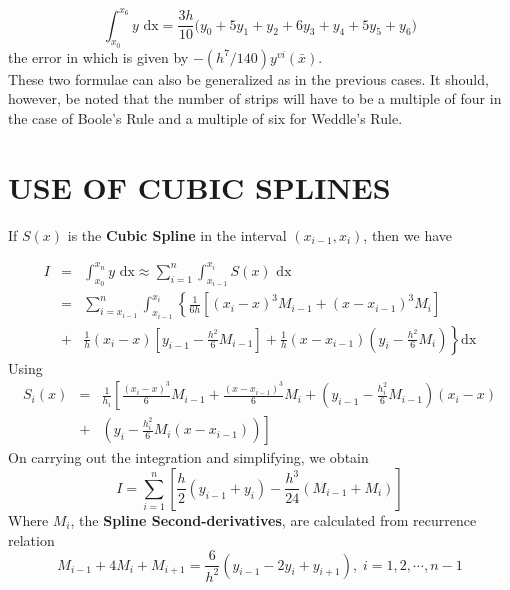 \documentclass[12pt]{report}
\newcommand{\sps}{\\[0.2cm]}
\newcommand{\bt}[1]{\textbf{#1}}
\begin{document}
	\begin{equation}
		\int_{x_0}^{x_6}y\text{ dx} = \frac{3h}{10}\big(y_0 + 5y_1 + y_2 + 6y_3 + y_4 + 5y_5 + y_6\big)
		\label{eq3_14} 
	\end{equation}
	the error in which is given by $-(h^7/140)y^{vi}(\bar{x})$.\sps
	These two formulae can also be generalized as in the previous cases. It should, however, be noted that the number of strips will have to be a multiple of four in the case of Boole's Rule and a multiple of six for Weddle's Rule.
	
	\section{USE OF CUBIC SPLINES}
	If $S(x)$ is the \bt{Cubic Spline} in the interval $(x_{i-1}, x_{i})$, then we have
	
	\begin{eqnarray*}
		I &=& \int_{x_0}^{x_n}y\text{ dx} \approx \sum_{i=1}^{n}\int_{{x_{i-1}}}^{x_i}S(x)\text{ dx}\sps
		&=& \sum_{i=x_{i-1}}^{n}\int_{x_{i-1}}^{x_i}\left\{\frac{1}{6h}\left[(x_i - x)^3M_{i-1} + (x-x_{i-1})^3M_i\right]\right. \sps
		&+&\left.\frac{1}{h}(x_i - x)\left[y_{i-1} - \frac{h^2}{6}M_{i-1}\right] +\frac{1}{h}(x-x_{i-1})\left(y_i - \frac{h^2}{6}M_i \right)\right\}\text{dx}
	\end{eqnarray*}
	Using
	\begin{eqnarray*}
		S_i(x) &=& \frac{1}{h_i}\left[\frac{(x_i - x)^3}{6}M_{i-1} + \frac{(x-x_{i-1})^3}{6}M_i + \left(y_{i-1} - \frac{h_i^2}{6}M_{i-1}\right)(x_i-x)\right. \sps
		&+& \left.\left(y_i - \frac{h_i^2}{6}M_i(x-x_{i-1})\right) \right]
	\end{eqnarray*}
	On carrying out the integration and simplifying, we obtain
	\begin{equation}
		I = \sum_{i=1}^{n}\left[\frac{h}{2}(y_{i-1} + y_i) - \frac{h^3}{24}(M_{i-1} + M_i)\right]
		\label{eq3_15}
	\end{equation}
	Where $M_i$, the \bt{Spline Second-derivatives}, are calculated from recurrence relation
	$$
		M_{i-1} + 4M_i + M_{i+1} = \frac{6}{h^2}(y_{i-1} - 2y_i + y_{i+1}), \; i=1,2,\cdots,n-1
	$$
	
\end{document}
